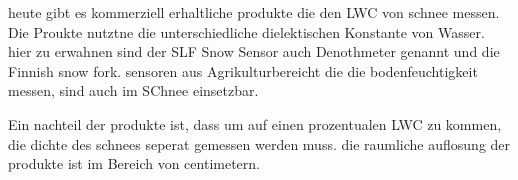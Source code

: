 heute gibt es kommerziell erhaltliche produkte die den LWC von schnee messen. Die Proukte nutztne die unterschiedliche dielektischen Konstante von Wasser. hier zu erwahnen sind der SLF Snow Sensor auch Denothmeter genannt und die Finnish snow fork. sensoren aus Agrikulturbereicht die die bodenfeuchtigkeit messen, sind auch im SChnee einsetzbar.

Ein nachteil der produkte ist, dass um auf einen prozentualen LWC zu kommen, die dichte des schnees seperat gemessen werden muss. die raumliche auflosung der produkte ist im Bereich von centimetern.

